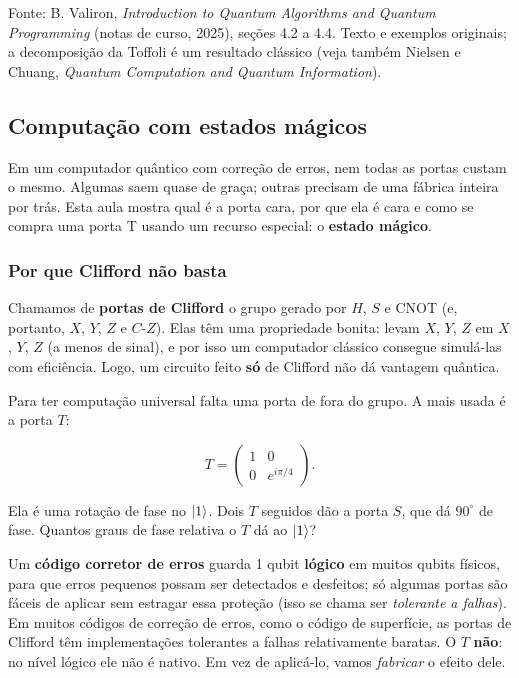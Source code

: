 Fonte: B. Valiron, \emph{Introduction to Quantum Algorithms and Quantum Programming} (notas de curso, 2025), seções 4.2 a 4.4. Texto e exemplos originais; a decomposição da Toffoli é um resultado clássico (veja também Nielsen e Chuang, \emph{Quantum Computation and Quantum Information}).

\subsection{Computação com estados mágicos}
Em um computador quântico com correção de erros, nem todas as portas custam o mesmo. Algumas saem quase de graça; outras precisam de uma fábrica inteira por trás. Esta aula mostra qual é a porta cara, por que ela é cara e como se compra uma porta T usando um recurso especial: o \textbf{estado mágico}.

\subsubsection{Por que Clifford não basta}\label{por-que-clifford-nuxe3o-basta}

Chamamos de \textbf{portas de Clifford} o grupo gerado por \(H\), \(S\) e CNOT (e, portanto, \(X\), \(Y\), \(Z\) e \(C\text{-}Z\)). Elas têm uma propriedade bonita: levam \(X\), \(Y\), \(Z\) em \(X\), \(Y\), \(Z\) (a menos de sinal), e por isso um computador clássico consegue simulá-las com eficiência. Logo, um circuito feito \textbf{só} de Clifford não dá vantagem quântica.

Para ter computação universal falta uma porta de fora do grupo. A mais usada é a porta \(T\):

\[
T = \begin{pmatrix} 1 & 0 \\ 0 & e^{i\pi/4} \end{pmatrix}.
\]

Ela é uma rotação de fase no \(\left|{1}\right>\). Dois \(T\) seguidos dão a porta \(S\), que dá \(90^\circ\) de fase. Quantos graus de fase relativa o \(T\) dá ao \(\left|{1}\right>\)?

Um \textbf{código corretor de erros} guarda 1 qubit \textbf{lógico} em muitos qubits físicos, para que erros pequenos possam ser detectados e desfeitos; só algumas portas são fáceis de aplicar sem estragar essa proteção (isso se chama ser \emph{tolerante a falhas}). Em muitos códigos de correção de erros, como o código de superfície, as portas de Clifford têm implementações tolerantes a falhas relativamente baratas. O \(T\) \textbf{não}: no nível lógico ele não é nativo. Em vez de aplicá-lo, vamos \emph{fabricar} o efeito dele.

